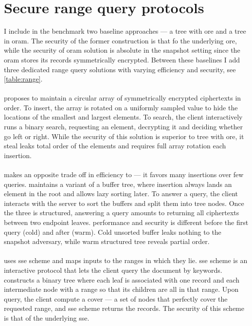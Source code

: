 	\section{Secure range query protocols}

		I include in the benchmark two baseline approaches --- a \BPlus{} tree with \gls{ore} and a \BPlus{} tree in \gls{oram}.
		The security of the former construction is that fo the underlying \gls{ore}, while the security of \gls{oram} solution is absolute in the snapshot setting since the \gls{oram} stores its records symmetrically encrypted.
		Between these baselines I add three dedicated range query solutions with varying efficiency and security, see \cref{table:range}.

		\paragraph*{\cite{florian-protocol}} proposes to maintain a circular array of symmetrically encrypted ciphertexts in order.
		To insert, the array is rotated on a uniformly sampled value to hide the locations of the smallest and largest elements.
		To search, the client interactively runs a binary search, requesting an element, decrypting it and deciding whether go left or right.
		While the security of this solution is superior to \BPlus{} tree with \gls{ore}, it steal leaks total order of the elements and requires full array rotation each insertion.

		\paragraph*{\cite{pope}} makes an opposite trade off in efficiency to \cite{florian-protocol} --- it favors many insertions over few queries.
		\cite{pope} maintains a variant of a buffer tree, where insertion always lands an element in the root and allows lazy sorting later.
		To answer a query, the client interacts with the server to sort the buffers and split them into tree nodes.
		Once the three is structured, answering a query amounts to returning all ciphertexts between two endpoint leaves.
		\cite{pope} performance and security is different before the first query (cold) and after (warm).
		Cold unsorted buffer leaks nothing to the snapshot adversary, while warm structured tree reveals partial order.

		\paragraph*{\cite{practical-range-search}} uses \gls{sse} scheme and maps inputs to the ranges in which they lie.
		\gls{sse} scheme is an interactive protocol that lets the client query the document by keywords.
		\cite{practical-range-search} constructs a binary tree where each leaf is associated with one record and each intermediate node with a range so that its children are all in that range.
		Upon query, the client compute a cover --- a set of nodes that perfectly cover the requested range, and \gls{sse} scheme returns the records.
		The security of this scheme is that of the underlying \gls{sse}.

